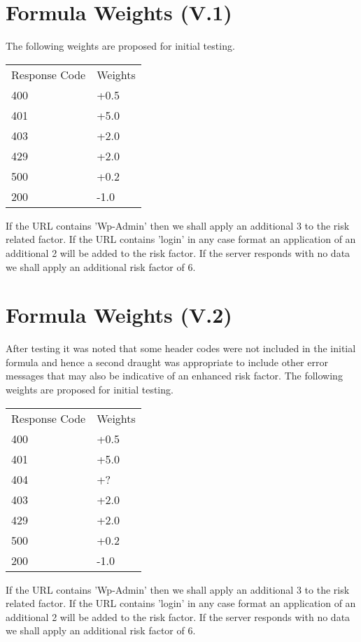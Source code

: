 \section{Formula Weights (V.1)} \label{Weights}

The following weights are proposed for initial testing.

\begin{table}[H]
\begin{tabular}{ll}
Response Code & Weights \\
400           & +0.5    \\
401           & +5.0    \\
403           & +2.0    \\
429           & +2.0    \\
500           & +0.2    \\
200           & -1.0   
\end{tabular}
\end{table}

If the URL contains 'Wp-Admin' then we shall apply an additional 3 to the risk related factor. If the URL contains 'login' in any case format an application of an additional 2 will be added to the risk factor. If the server responds with no data we shall apply an additional risk factor of 6.

\section{Formula Weights (V.2)}

After testing it was noted that some header codes were not included in the initial formula and hence a second draught was appropriate to include other error messages that may also be indicative of an enhanced risk factor.
The following weights are proposed for initial testing.

\begin{table}[H]
\begin{tabular}{ll}
Response Code & Weights \\
400           & +0.5    \\
401           & +5.0    \\
404           & +? \\
403           & +2.0    \\
429           & +2.0    \\
500           & +0.2    \\
200           & -1.0   
\end{tabular}
\end{table}

If the URL contains 'Wp-Admin' then we shall apply an additional 3 to the risk related factor. If the URL contains 'login' in any case format an application of an additional 2 will be added to the risk factor. If the server responds with no data we shall apply an additional risk factor of 6.